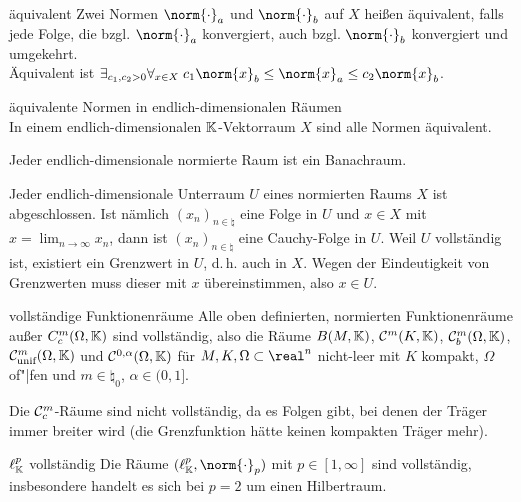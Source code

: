 \begin{Def}{äquivalent}
    Zwei Normen $\norm{\cdot}_a$ und $\norm{\cdot}_b$ auf $X$ heißen äquivalent, falls
    jede Folge, die bzgl. $\norm{\cdot}_a$ konvergiert, auch bzgl. $\norm{\cdot}_b$ konvergiert
    und umgekehrt.\\
    Äquivalent ist
    $\exists_{c_1, c_2 > 0} \forall_{x \in X}\; c_1 \norm{x}_b \le \norm{x}_a \le c_2 \norm{x}_b$.
\end{Def}

\begin{Satz}{äquivalente Normen in endlich-dimensionalen Räumen}\\
    In einem endlich-dimensionalen $\mathbb{K}$-Vektorraum $X$ sind alle Normen äquivalent.
\end{Satz}

\begin{Kor}
    Jeder endlich-dimensionale normierte Raum ist ein Banachraum.
\end{Kor}

\begin{Bem}
    Jeder endlich-dimensionale Unterraum $U$ eines normierten Raums $X$ ist abgeschlossen.
    Ist nämlich $(x_n)_{n \in \natural}$ eine Folge in $U$ und $x \in X$ mit
    $x = \lim_{n \to \infty} x_n$, dann ist $(x_n)_{n \in \natural}$ eine Cauchy-Folge in $U$.
    Weil $U$ vollständig ist, existiert ein Grenzwert in $U$, d.\,h. auch in $X$.
    Wegen der Eindeutigkeit von Grenzwerten muss dieser mit $x$ übereinstimmen, also $x \in U$.
\end{Bem}

\linie

\begin{Satz}{vollständige Funktionenräume}
    Alle oben definierten, normierten Funktionenräume außer $C^m_c(\Omega, \mathbb{K})$ sind
    vollständig,
    also die Räume
    $B(M, \mathbb{K})$,
    $\mathcal{C}^m(K, \mathbb{K})$,
    $\mathcal{C}^m_b(\Omega, \mathbb{K})$,
    $\mathcal{C}^m_{\text{unif}}(\Omega, \mathbb{K})$ und
    $\mathcal{C}^{0,\alpha}(\Omega, \mathbb{K})$
    für $M, K, \Omega \subset \real^n$ nicht-leer mit $K$ kompakt, $\Omega$ of"|fen und
    $m \in \natural_0$, $\alpha \in (0, 1]$.
\end{Satz}

\begin{Bem}
    Die $\mathcal{C}^m_c$-Räume sind nicht vollständig, da es Folgen gibt, bei denen der Träger immer
    breiter wird (die Grenzfunktion hätte keinen kompakten Träger mehr).
\end{Bem}

\begin{Satz}{$\ell^p_{\mathbb{K}}$ vollständig}
    Die Räume $(\ell^p_\KK, \norm{\cdot}_p)$ mit $p \in [1, \infty]$
    sind vollständig, insbesondere handelt es sich bei $p = 2$ um einen Hilbertraum.
\end{Satz}

